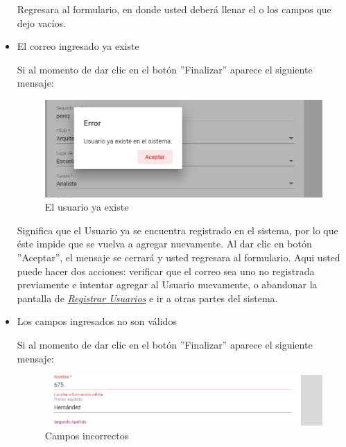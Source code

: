 \begin{itemize}
\begin{figure}[!hbtp]
                         \end{figure}

                           Regresara  al formulario, en donde usted deberá llenar el o los campos que dejo vacíos.
                          \item El correo ingresado ya existe

                        Si al momento de dar clic en el botón ''Finalizar'' aparece el siguiente mensaje:

                        \begin{figure}[!hbtp]
                        	\centering
                        	\includegraphics[width=0.4\linewidth]{images/SP5/MSG36}
                        	\caption{El usuario ya existe}
                        	\label{mensaje36}

                        \end{figure}

                        Significa que el Usuario ya se encuentra registrado en el sistema, por lo que éste impide que se vuelva a agregar nuevamente. Al dar clic en botón ''Aceptar'', el mensaje se cerrará y usted regresara al formulario. Aqui usted puede hacer dos acciones: verificar que el correo sea uno no registrada previamente e intentar agregar al Usuario nuevamente, o abandonar la pantalla de \hyperlink{registrarUs}{\textit{Registrar Usuarios}} e ir a otras partes del sistema.

                        \item Los campos ingresados no son válidos

                            Si al momento de dar clic en el botón ''Finalizar'' aparece el siguiente mensaje:
                            \clearpage
                                \begin{figure}[!hbtp]
                         	\centering
                         	\includegraphics[width=0.4\linewidth]{images/SP5/MSG35}
                         	\caption{Campos incorrectos}
                         	\label{mensaje35}


\end{figure}
\end{itemize}
